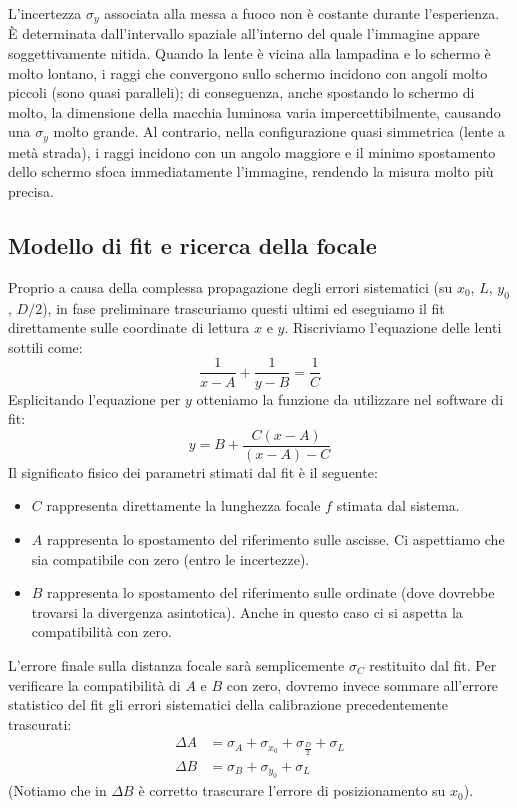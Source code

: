 \documentclass[openany,a4paper,12pt]{book}
\begin{document}
L'incertezza $\sigma_y$ associata alla messa a fuoco non è costante durante l'esperienza. È determinata dall'intervallo spaziale all'interno del quale l'immagine appare soggettivamente nitida. Quando la lente è vicina alla lampadina e lo schermo è molto lontano, i raggi che convergono sullo schermo incidono con angoli molto piccoli (sono quasi paralleli); di conseguenza, anche spostando lo schermo di molto, la dimensione della macchia luminosa varia impercettibilmente, causando una $\sigma_y$ molto grande. Al contrario, nella configurazione quasi simmetrica (lente a metà strada), i raggi incidono con un angolo maggiore e il minimo spostamento dello schermo sfoca immediatamente l'immagine, rendendo la misura molto più precisa.

\subsection*{Modello di fit e ricerca della focale}
Proprio a causa della complessa propagazione degli errori sistematici (su $x_0$, $L$, $y_0$, $D/2$), in fase preliminare trascuriamo questi ultimi ed eseguiamo il fit direttamente sulle coordinate di lettura $x$ e $y$. Riscriviamo l'equazione delle lenti sottili come:
\begin{equation}
    \frac{1}{x-A} + \frac{1}{y-B} = \frac{1}{C}
\end{equation}
Esplicitando l'equazione per $y$ otteniamo la funzione da utilizzare nel software di fit:
\begin{equation}
    y = B + \frac{C(x-A)}{(x-A) - C}
\end{equation}
Il significato fisico dei parametri stimati dal fit è il seguente:
\begin{itemize}
    \item $C$ rappresenta direttamente la lunghezza focale $f$ stimata dal sistema.
    \item $A$ rappresenta lo spostamento del riferimento sulle ascisse. Ci aspettiamo che sia compatibile con zero (entro le incertezze).
    \item $B$ rappresenta lo spostamento del riferimento sulle ordinate (dove dovrebbe trovarsi la divergenza asintotica). Anche in questo caso ci si aspetta la compatibilità con zero.
\end{itemize}

L'errore finale sulla distanza focale sarà semplicemente $\sigma_C$ restituito dal fit. Per verificare la compatibilità di $A$ e $B$ con zero, dovremo invece sommare all'errore statistico del fit gli errori sistematici della calibrazione precedentemente trascurati:
\begin{align*}
    \Delta A &= \sigma_A + \sigma_{x_0} + \sigma_{\frac{D}{2}} + \sigma_L \\
    \Delta B &= \sigma_B + \sigma_{y_0} + \sigma_L
\end{align*}
(Notiamo che in $\Delta B$ è corretto trascurare l'errore di posizionamento su $x_0$).\
\end{document}
